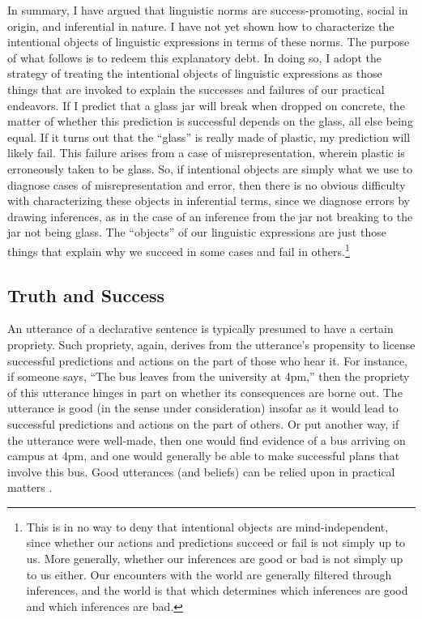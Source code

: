 In summary, I have argued that linguistic norms are success-promoting, social in origin, and inferential in nature. I have not yet shown how to characterize the intentional objects of linguistic expressions in terms of these norms. The purpose of what follows is to redeem this explanatory debt. In doing so, I adopt the strategy of treating the intentional objects of linguistic expressions as those things that are invoked to explain the successes and failures of our practical endeavors. If I predict that a glass jar will break when dropped on concrete, the matter of whether this prediction is successful depends on the glass, all else being equal. If it turns out that the ``glass'' is really made of plastic, my prediction will likely fail. This failure arises from a case of misrepresentation, wherein plastic is erroneously taken to be glass. So, if intentional objects are simply what we use to diagnose cases of misrepresentation and error, then there is no obvious difficulty with characterizing these objects in inferential terms, since we diagnose errors by drawing inferences, as in the case of an inference from the jar not breaking to the jar not being glass. The ``objects'' of our linguistic expressions are just those things that explain why we succeed in some cases and fail in others.\footnote{This is in no way to deny that intentional objects are mind-independent, since whether our actions and predictions succeed or fail is not simply up to us. More generally, whether our inferences are good or bad is not simply up to us either. Our encounters with the world are generally filtered through inferences, and the world is that which determines which inferences are good and which inferences are bad.} 
 
\subsection{Truth and Success}

An utterance of a declarative sentence is typically presumed to have a certain propriety. Such propriety, again, derives from the utterance's propensity to license successful predictions and actions on the part of those who hear it. For instance, if someone says, ``The bus leaves from the university at 4pm,'' then the propriety of this utterance hinges in part on whether its consequences are borne out. The utterance is good (in the sense under consideration) insofar as it would lead to successful predictions and actions on the part of others. Or put another way, if the utterance were well-made, then one would find evidence of a bus arriving on campus at 4pm, and one would generally be able to make successful plans that involve this bus. Good utterances (and beliefs) can be relied upon in practical matters \citep{Misak:2007}. 

